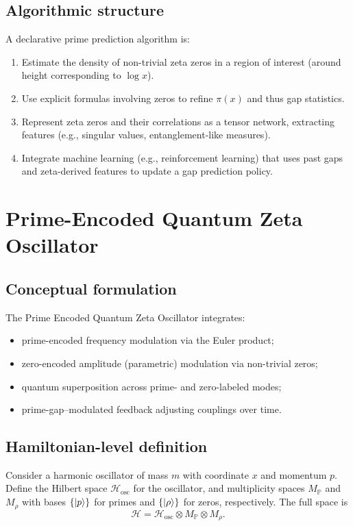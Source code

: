 \documentclass[11pt]{article}
\begin{document}
\subsection{Algorithmic structure}

A declarative prime prediction algorithm is:
\begin{enumerate}[nosep,label=Step \arabic*:]
    \item Estimate the density of non-trivial zeta zeros in a region of interest (around height corresponding to $\log x$).\cite{file2}
    \item Use explicit formulas involving zeros to refine $\pi(x)$ and thus gap statistics.\cite{file2}
    \item Represent zeta zeros and their correlations as a tensor network, extracting features (e.g., singular values, entanglement-like measures).\cite{file2}
    \item Integrate machine learning (e.g., reinforcement learning) that uses past gaps and zeta-derived features to update a gap prediction policy.\cite{file2}
\end{enumerate}

\section{Prime-Encoded Quantum Zeta Oscillator}

\subsection{Conceptual formulation}

The Prime Encoded Quantum Zeta Oscillator integrates:
\begin{itemize}[nosep]
    \item prime-encoded frequency modulation via the Euler product;
    \item zero-encoded amplitude (parametric) modulation via non-trivial zeros;
    \item quantum superposition across prime- and zero-labeled modes;
    \item prime-gap–modulated feedback adjusting couplings over time.\cite{file3}
\end{itemize}

\subsection{Hamiltonian-level definition}

Consider a harmonic oscillator of mass $m$ with coordinate $x$ and momentum $p$. Define the Hilbert space $\mathcal{H}_{\text{osc}}$ for the oscillator, and multiplicity spaces $M_{\mathbb{P}}$ and $M_{\rho}$ with bases $\{\ket{p}\}$ for primes and $\{\ket{\rho}\}$ for zeros, respectively. The full space is
\[
\mathcal{H} = \mathcal{H}_{\text{osc}} \otimes M_{\mathbb{P}} \otimes M_{\rho}.
\]
\end{document}
